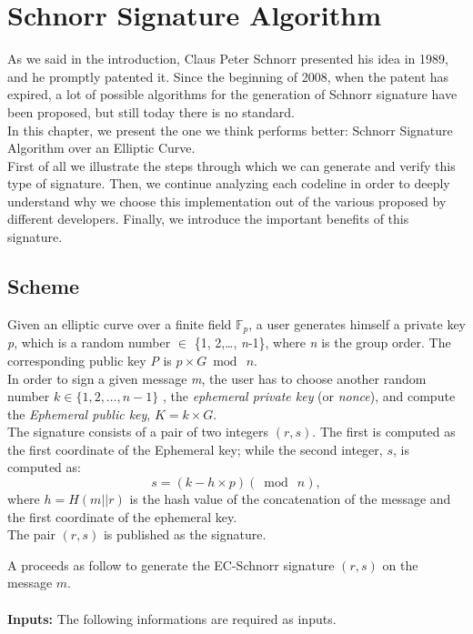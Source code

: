 \chapter{Schnorr Signature Algorithm}
\label{capitolo3}
\thispagestyle{empty}

As we said in the introduction, Claus Peter Schnorr presented his idea in 1989, and he promptly patented it. Since the beginning of 2008, when the patent has expired, a lot of possible algorithms for the generation of Schnorr signature have been proposed, but still today there is no standard.\\
In this chapter, we present the one we think performs better: Schnorr Signature Algorithm over an Elliptic Curve.\\
First of all we illustrate the steps through which we can generate and verify this type of signature.
Then, we continue analyzing each codeline in order to deeply understand why we choose this implementation out of the various proposed by different developers.
Finally, we introduce the important benefits of this signature.



\section{Scheme}
Given an elliptic curve over a finite field $\mathbb{F} _{p}$, a user generates himself a private key \textit{p}, which is a random number $\in$ \{1, 2,\dots, \textit{n}-1\}, where \textit{n} is the group order. The corresponding public key \textit{P} is $\textit{p}\times G\bmod\ n$. \\
In order to sign a given message \textit{m}, the user has to choose another random number $k\in \{1, 2, \dots, \textit{n}-1\}$
, the \textit{ephemeral private key} (or \textit{nonce}), and compute the \textit{Ephemeral public key}, $\textit{K}= k \times G$.
\\
The signature consists of a pair of two integers $(r, s)$. The first is computed as the first coordinate of the Ephemeral
key; while the second integer, $s$, is 
computed as: 
\begin{equation}
\label{eqn:s}
s=(k - h \times p)(\bmod\ n),
\end{equation}
where $h=H(m||r)$ is the hash value of the concatenation of the message and the first coordinate of the ephemeral key. \\
The pair $(r,s)$ is published as the signature.

A proceeds as follow to generate the EC-Schnorr signature $(r, s)$ on the message $m$.\\
\\
\textbf{Inputs:} The following informations are required as inputs.


